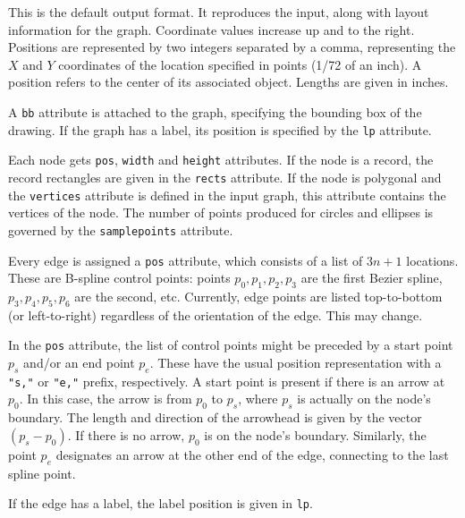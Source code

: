 \documentclass[11pt]{article}
\begin{document}
This is the default output format. It reproduces the input, 
along with layout information for the graph. Coordinate values
increase up and to the right. Positions are represented by two
integers separated by a comma, representing the $X$ and $Y$ coordinates
of the location specified in points (1/72 of an inch). A position
refers to the center of its associated object.
Lengths are given in inches.

A {\tt bb} attribute is attached to the graph, 
specifying the bounding box of the drawing. If the graph has a label, 
its position is specified by the {\tt lp} attribute. 

Each node gets {\tt pos}, {\tt width} and {\tt height} attributes. 
If the node is a record, the record rectangles are given in the {\tt rects}
attribute. If the node is polygonal and the {\tt vertices} 
attribute is defined in the input graph, this attribute contains the 
vertices of the node. The number of points produced for circles and ellipses
is governed by the {\tt samplepoints} attribute.

Every edge is assigned a {\tt pos} attribute, which consists of
a list of $3n + 1$ locations. These are B-spline control points:
points $p_0, p_1, p_2, p_3$ are the first Bezier spline,
$p_3, p_4, p_5, p_6$ are the second, etc.
Currently, edge points are listed top-to-bottom (or left-to-right)
regardless of the orientation of the edge. This may change.

In the {\tt pos} attribute, the list of control points might
be preceded by a start point $p_s$ and/or an end point $p_e$. These have the
usual position representation with a {\tt "s,"} or {\tt "e,"}
prefix, respectively. A start point is present if there is an 
arrow at $p_0$.
In this case, the arrow is from $p_0$ to $p_s$, where
$p_s$ is actually on the node's boundary. The length and direction
of the arrowhead
is given by the vector $(p_s - p_0)$.
If there is no arrow, $p_0$ is on the node's boundary.
Similarly, the point $p_e$ designates an arrow at the other end of the
edge, connecting to the last spline point.

If the edge has a label, the label position is given in {\tt lp}. 

\clearpage
\end{document}

